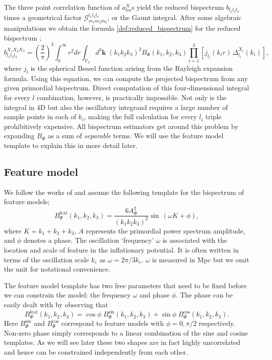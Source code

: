 The three point correlation function of $a_{lm}^X$s yield the reduced bispectrum $b_{l_1 l_2 l_3}$ times a geometrical factor $\mathcal{G}^{l_1 l_2 l_3}_{m_1 m_2 m_3}$, or the Gaunt integral. After some algebraic manipulations we obtain the formula \eqref{def:reduced_bispectrum} for the reduced bispectrum ;
\begin{equation}
	b_{l_1 l_2 l_3}^{X_1 X_2 X_3} = \left(\frac{2}{\pi}\right)^3 \int_{0}^{\infty} r^2 dr \int_{\mathcal{V}_k} d^3\textbf{k} \; (k_1 k_2 k_3)^2 B_\Phi (k_1, k_2, k_3) \prod_{i=1}^{3} \left[ j_{l_i}(k_i r) \, \Delta_{l_i}^{X_i}(k_i) \right],
	\label{reduced bispectrum}
\end{equation}
where $j_l$ is the spherical Bessel function arising from the Rayleigh expansion formula. Using this equation, we can compute the projected bispectrum from any given primordial bispectrum. Direct computation of this four-dimensional integral for every $l$ combination, however, is practically impossible. Not only is the integral in 4D but also the oscillatory integrand requires a large number of sample points in each of $k_i$, making the full calculation for every $l_i$ triple prohibitively expensive. All bispectrum estimators get around this problem by expanding $B_\Phi$ as a sum of \textit{separable} terms. We will use the feature model template to explain this in more detail later.

\subsection{Feature model}

We follow the works of \cite{Munchmeyer2014,Fergusson2015a,Fergusson2015b,PlanckCollaboration2015} and assume the following template for the bispectrum of feature models;
\begin{equation}
	B_\Phi ^ {\text{feat}}(k_1, k_2, k_3) = \frac{6 A_\Phi^2}{(k_1 k_2 k_3)^2} \sin\,(\omega K + \phi),
	\label{feature model definition}
\end{equation}
where $K = k_1 + k_2 + k_3$, $A$ represents the primordial power spectrum amplitude, and $\phi$ denotes a phase. The oscillation `frequency' $\omega$ is associated with the location and scale of feature in the inflationary potential. It is often written in terms of the oscillation scale $k_c$ as $\omega = 2\pi/3k_c$. $\omega$ is measured in Mpc but we omit the unit for notational convenience.

The feature model template has two free parameters that need to be fixed before we can constrain the model: the frequency $\omega$ and phase $\phi$. The phase can be easily dealt with by observing that
\begin{equation}
	B_\Phi^\text{feat}(k_1, k_2, k_3) = \cos\phi \; B_\Phi^\text{sin} (k_1, k_2, k_3) + \sin\phi \; B_\Phi^\text{cos} (k_1, k_2, k_3).
	\label{feature model bispectrum as a sum of sin and cos}
\end{equation}
Here $B_\Phi^\text{sin}$ and $B_\Phi^\text{cos}$ correspond to feature models with $\phi = 0, \pi/2$ respectively. Non-zero phase simply corresponds to a linear combination of the sine and cosine templates. As we will see later these two shapes are in fact highly uncorrelated and hence can be constrained independently from each other.

